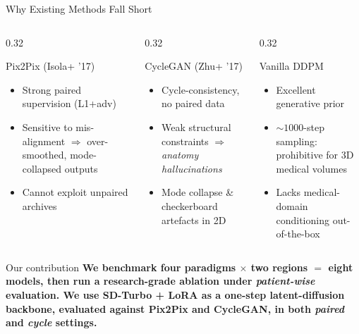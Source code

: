 \documentclass[aspectratio=169,10pt]{beamer}
\begin{document}
\begin{frame}{Why Existing Methods Fall Short}
\footnotesize
\begin{columns}[T]
\begin{column}{0.32\textwidth}
\begin{block}{Pix2Pix \tiny(Isola+ '17)}
\begin{itemize}
    \item Strong paired supervision (L1+adv)
    \item Sensitive to mis-alignment $\Rightarrow$ over-smoothed, mode-collapsed outputs
    \item Cannot exploit unpaired archives
\end{itemize}
\end{block}
\end{column}
\begin{column}{0.32\textwidth}
\begin{block}{CycleGAN \tiny(Zhu+ '17)}
\begin{itemize}
    \item Cycle-consistency, no paired data
    \item Weak structural constraints $\Rightarrow$ \emph{anatomy hallucinations}
    \item Mode collapse \& checkerboard artefacts in 2D
\end{itemize}
\end{block}
\end{column}
\begin{column}{0.32\textwidth}
\begin{block}{Vanilla DDPM}
\begin{itemize}
    \item Excellent generative prior
    \item ${\sim}1000$-step sampling: prohibitive for 3D medical volumes
    \item Lacks medical-domain conditioning out-of-the-box
\end{itemize}
\end{block}
\end{column}
\end{columns}

\vspace{1mm}
\begin{exampleblock}{Our contribution}
\textbf{We benchmark \textbf{four paradigms} $\times$ \textbf{two regions} $=$ \textbf{eight models}, then run a research-grade ablation under \emph{patient-wise} evaluation. We use \textbf{SD-Turbo + LoRA} as a one-step latent-diffusion backbone, evaluated against Pix2Pix and CycleGAN, in both \emph{paired} and \emph{cycle} settings.}
\end{exampleblock}
\end{frame}
\end{document}
